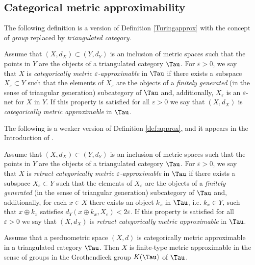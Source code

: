 \subsection{Categorical metric approximability}
The following definition is a version of Definition \ref{Turingapprox} with the concept of \textit{group} replaced by \textit{triangulated category}.
\begin{dfn} \label{def:approx} Assume that $(X,d_X)\subset (Y,d_Y)$ is an inclusion of metric spaces such that the points in $Y$ are the objects of a triangulated category $\Tau$. For $\varepsilon > 0$, we say that 
$X$ is   {\em categorically metric $\varepsilon$-approximable} in $\Tau$ if there exists a subspace $X_{\varepsilon}\subset Y$ such that the elements of $X_{\varepsilon}$ are the objects of a {\em finitely generated} (in the sense of triangular generation) subcategory of $\Tau$ and, additionally, $X_{\varepsilon}$ is an $\varepsilon$-net for $X$ in $Y$.  If this property is satisfied for all $\varepsilon >0$ we say that $(X,d_X)$ is {\em categorically metric approximable} in $\Tau$. 
\end{dfn}
The following is a weaker version of Definition \ref{def:approx}, and it appears in the Introduction of \cite{ABC26}.
\begin{dfn}\label{def:rapprox}
    Assume that $(X,d_X)\subset (Y,d_Y)$ is an inclusion of metric spaces such that the points in $Y$ are the objects of a triangulated category $\Tau$. For $\varepsilon > 0$, we say that 
$X$ is   {\em retract categorically metric $\varepsilon$-approximable} in $\Tau$ if there exists a subspace $X_{\varepsilon}\subset Y$ such that the elements of $X_{\varepsilon}$ are the objects of a {\em finitely generated} (in the sense of triangular generation) subcategory of $\Tau$ and, additionally, for each $x\in X$
there exists an object $k_{x}$ in $\Tau$, i.e. $k_x\in Y$, such that $x\oplus k_{x}$ satisfies
$d_Y(x\oplus k_{x}, X_{\varepsilon}) < 2\varepsilon$.  If this property is satisfied for all $\varepsilon >0$ we say that $(X,d_X)$ is {\em retract categorically metric approximable} in $\Tau$. 
\end{dfn}

\begin{remark}
    Assume that a pseduometric space $(X,d)$ is categorically metric approximable in a triangulated category $\Tau$. Then $X$ is finite-type metric approximable in the sense of groups in the Grothendieck group $K(\Tau)$ of $\Tau$.
\end{remark}

